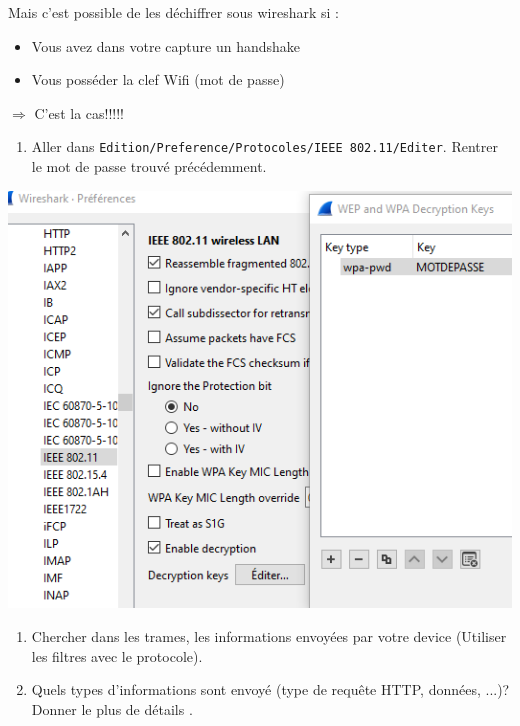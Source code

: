 \documentclass[french, 12pt]{article}%
\newcommand{\itemE}{\item[$\bullet$]}
\begin{document}
Mais c'est possible de les déchiffrer sous wireshark si : 
\begin{itemize}
\itemE Vous avez dans votre capture un handshake
\itemE Vous posséder la clef Wifi (mot de passe)
\end{itemize}

$\Rightarrow$ C'est la cas!!!!!

\begin{enumerate}[resume]
\item Aller dans \verb?Edition/Preference/Protocoles/IEEE 802.11/Editer?. Rentrer le mot de passe trouvé précédemment. 
\end{enumerate}


\begin{center}
\includegraphics[scale=0.7]{./ressource/wiresharkMotdePasse}
\end{center}




\begin{enumerate}[resume]
\item Chercher dans les trames, les informations envoyées par votre device (Utiliser les filtres avec le protocole).
\itemE Quels types d'informations sont envoyé (type de requête HTTP, données, ...)? Donner le plus de détails .
\end{enumerate}
\end{document}
